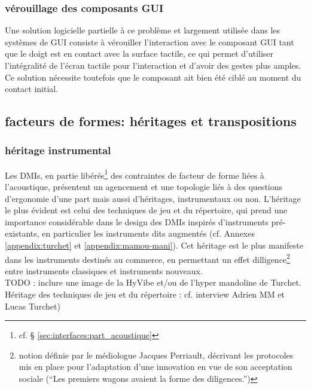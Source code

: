 \subsubsection{vérouillage des composants GUI}
Une solution logicielle partielle à ce problème et largement utilisée dans les systèmes de \gls{GUI} consiste à vérouiller l'interaction avec le composant GUI tant que le doigt est en contact avec la surface tactile, ce qui permet d'utiliser l'intégralité de l'écran tactile pour l'interaction et d'avoir des gestes plus amples. Ce solution nécessite toutefois que le composant ait bien été ciblé au moment du contact initial.



\subsection{facteurs de formes: héritages et transpositions}

\subsubsection{héritage instrumental}

\noindent Les \glspl{DMI}, en partie libérés\footnote{cf. § \ref{sec:interfaces:part_acoustique}} des contraintes de facteur de forme liées à l'acoustique, présentent un agencement et une topologie liés à des questions d'ergonomie d'une part mais aussi d'héritages, instrumentaux ou non. L'héritage le plus évident est celui des techniques de jeu et du répertoire, qui prend une importance considérable dans le design des \glspl{DMI} inspirés d'instruments pré-existants, en particulier les instruments dits augmentés (cf. Annexes \ref{appendix:turchet} et \ref{appendix:mamou-mani}). Cet héritage est le plus manifeste dans les instruments destinés au commerce, en permettant un effet dilligence\footnote{notion définie par le médiologue Jacques Perriault, décrivant les protocoles mis en place pour l'adaptation d'une innovation en vue de son acceptation sociale (``Les premiers wagons avaient la forme des diligences.'')} entre instruments classiques et instruments nouveaux.\\

TODO : inclure une image de la HyVibe et/ou de l'hyper mandoline de Turchet.\\
Héritage des techniques de jeu et du répertoire : cf. interview Adrien MM et Lucas Turchet) 


